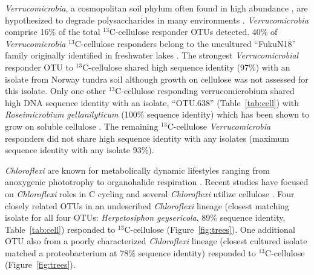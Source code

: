 \textit{Verrucomicrobia}, a cosmopolitan soil phylum often found in high
abundance \citep{Fierer_2013}, are hypothesized to degrade polysaccharides in
many environments \citep{Fierer_2013,Herlemann_2013,10543821}.
\textit{Verrucomicrobia} comprise 16\% of the total $^{13}$C-cellulose
responder OTUs detected. 40\% of \textit{Verrucomicrobia} $^{13}$C-cellulose
responders belong to the uncultured ``FukuN18'' family originally identified in
freshwater lakes \citep{Parveen_2013}.  The strongest \textit{Verrucomicrobial}
responder OTU to $^{13}$C-cellulose shared high sequence identity (97\%) with
an isolate from Norway tundra soil \citep{Jiang_2011} although growth on
cellulose was not assessed for this isolate. Only one other $^{13}$C-cellulose
responding verrucomicrobium shared high DNA sequence identity with an
isolate, ``OTU.638'' (Table~\ref{tab:cell}) with \textit{Roseimicrobium
gellanilyticum} (100\% sequence identity) which has been shown to grow on
soluble cellulose \citep{Otsuka_2012}. The remaining $^{13}$C-cellulose
\textit{Verrucomicrobia} responders did not share high sequence identity with
any isolates (maximum sequence identity with any isolate
93\%).

\textit{Chloroflexi} are known for metabolically dynamic
lifestyles ranging from anoxygenic phototrophy to organohalide respiration
\citep{Hug_2013}. Recent studies have focused on \textit{Chloroflexi} roles in
C cycling \citep{Hug_2013, Goldfarb_2011,Cole_2013} and several
\textit{Chloroflexi} utilize cellulose \citep{Goldfarb_2011, Cole_2013,
Hug_2013}. Four closely related OTUs in an undescribed \textit{Chloroflexi}
lineage (closest matching isolate for all four OTUs:
\textit{Herpetosiphon geysericola}, 89\% sequence identity,
Table~\ref{tab:cell}) responded to $^{13}$C-cellulose (Figure~\ref{fig:trees}).
One additional OTU also from a poorly characterized \textit{Chloroflexi}
lineage (closest cultured isolate matched a proteobacterium at 78\% sequence
identity) responded to $^{13}$C-cellulose (Figure~\ref{fig:trees}).

